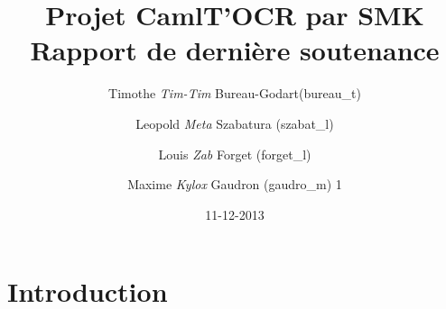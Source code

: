 \documentclass[12pt]{article}
\title{Projet CamlT'OCR par SMK \\ Rapport de dernière soutenance}
\date{11-12-2013}
\author{
  Timothe \textit{Tim-Tim} Bureau-Godart(bureau\_t) \and
  Leopold \textit{Meta} Szabatura (szabat\_l) \and
  Louis \textit{Zab} Forget (forget\_l) \and
  Maxime \textit{Kylox} Gaudron (gaudro\_m)
1      }
\begin{document}
\maketitle
\newpage
\tableofcontents
\newpage
\section{Introduction}







\end{document}
